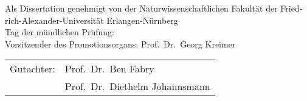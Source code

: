 \thispagestyle{empty}
\begin{otherlanguage}{german}
  Als Dissertation genehmigt von der Naturwissenschaftlichen Fakultät der
  Friedrich-Alexander-Universität Erlangen-Nürnberg\\

  \vspace{18.0cm}
  Tag der mündlichen Prüfung: \\

  Vorsitzender des Promotionsorgans: Prof.~Dr.~Georg Kreimer\\

  \begin{tabular}{@{}ll@{}}
    Gutachter: & Prof.~Dr.~Ben Fabry \tabularnewline%
     & Prof.~Dr.~Diethelm Johannsmann
  \end{tabular}
\end{otherlanguage}
